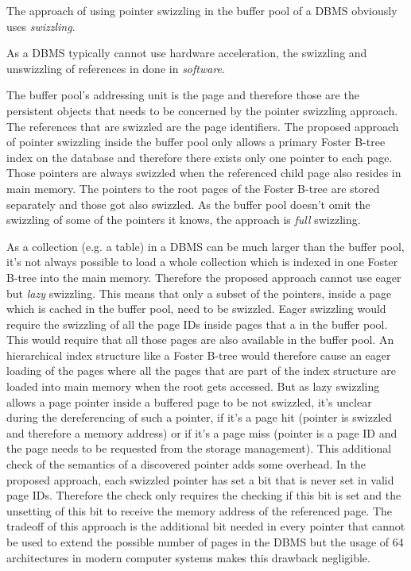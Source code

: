 	The approach of using pointer swizzling in the buffer pool of a DBMS obviously uses \emph{swizzling}.
	
	As a DBMS typically cannot use hardware acceleration, the swizzling and unswizzling of references in done in \emph{software}.
	
	The buffer pool's addressing unit is the page and therefore those are the persistent objects that needs to be concerned by the pointer swizzling approach. The references that are swizzled are the page identifiers. The proposed approach of pointer swizzling inside the buffer pool only allows a primary Foster B-tree index \cite{Graefe:2012} on the database and therefore there exists only one pointer to each page. Those pointers are always swizzled when the referenced child page also resides in main memory. The pointers to the root pages of the Foster B-tree are stored separately and those got also swizzled. As the buffer pool doesn't omit the swizzling of some of the pointers it knows, the approach is \emph{full} swizzling.
	
	As a collection (e.g. a table) in a DBMS can be much larger than the buffer pool, it's not always possible to load a whole collection which is indexed in one Foster B-tree into the main memory. Therefore the proposed approach cannot use eager but \emph{lazy} swizzling. This means that only a subset of the pointers, inside a page which is cached in the buffer pool, need to be swizzled. Eager swizzling would require the swizzling of all the page IDs inside pages that a in the buffer pool. This would require that all those pages are also available in the buffer pool. An hierarchical index structure like a Foster B-tree would therefore cause an eager loading of the pages where all the pages that are part of the index structure are loaded into main memory when the root gets accessed. But as lazy swizzling allows a page pointer inside a buffered page to be not swizzled, it's unclear during the dereferencing of such a pointer, if it's a page hit (pointer is swizzled and therefore a memory address) or if it's a page miss (pointer is a page ID and the page needs to be requested from the storage management). This additional check of the semantics of a discovered pointer adds some overhead. In the proposed approach, each swizzled pointer has set a bit that is never set in valid page IDs. Therefore the check only requires the checking if this bit is set and the unsetting of this bit to receive the memory address of the referenced page. The tradeoff of this approach is the additional bit needed in every pointer that cannot be used to extend the possible number of pages in the DBMS but the usage of \SI{64}{\bit} architectures in modern computer systems makes this drawback negligible.
	
